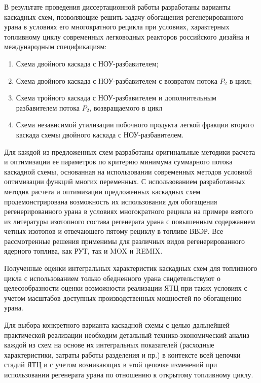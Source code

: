 В результате проведения диссертационной работы разработаны варианты каскадных схем, позволяющие решить задачу обогащения регенерированного урана в условиях его многократного рецикла при условиях, характерных топливному циклу современных легководных реакторов российского дизайна и международным спецификациям:

\begin{enumerate}
  \item Схема двойного каскада с НОУ-разбавителем;
  \item Схема двойного каскада с НОУ-разбавителем с возвратом потока $P_2$ в цикл;
  \item Схема тройного каскада с НОУ-разбавителем и дополнительным разбавителем потока $P_2$, возвращаемого в цикл
  \item Схема независимой утилизации побочного продукта легкой фракции второго каскада схемы двойного каскада с НОУ-разбавителем.
\end{enumerate}

Для каждой из предложенных схем разработаны оригинальные методики расчета и оптимизации ее параметров по критерию минимума суммарного потока каскадной схемы, основанная на использовании современных методов условной оптимизации функций многих переменных. С использованием разработанных методик расчета и оптимизации предложенных каскадных схем продемонстрирована возможность их использования для обогащения регенерированного урана в условиях многократного рецикла на примере взятого из литературы изотопного состава регенерата урана с повышенным содержанием четных изотопов и отвечающего пятому рециклу в топливе ВВЭР. Все рассмотренные решения применимы для различных видов регенерированного ядерного топлива, как РУТ, так и MOX и REMIX.

Полученные оценки интегральных характеристик каскадных схем для топливного цикла с использованием только обедненного урана свидетельствуют о целесообразности оценки возможности реализации ЯТЦ при таких условиях с учетом масштабов доступных производственных мощностей по обогащению урана.

Для выбора конкретного варианта каскадной схемы с целью дальнейшей практической реализации необходим детальный технико-экономический анализ каждой из схем на основе их интегральных показателей (расходные характеристики, затраты работы разделения и пр.) в контексте всей цепочки стадий ЯТЦ и с учетом возникающих в этой цепочке изменений при использовании регенерата урана по отношению к открытому топливному циклу. 

